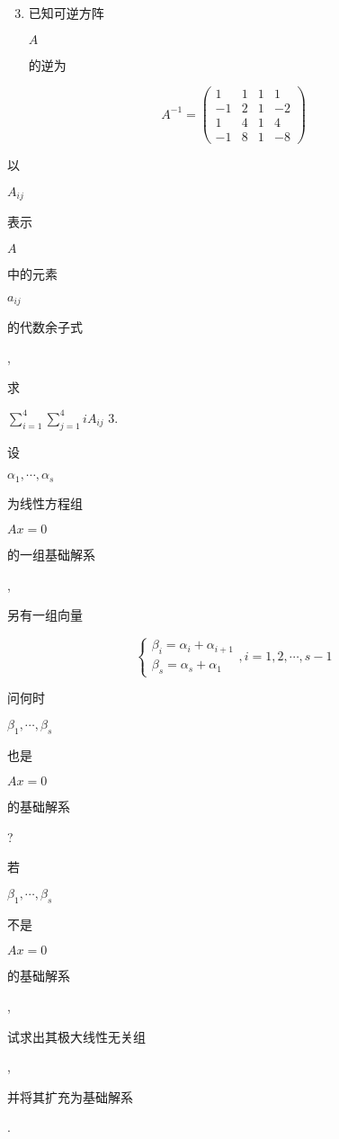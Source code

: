 \documentclass[10pt]{article}
\begin{document}
\begin{enumerate}
  \setcounter{enumi}{2}
  \item \begin{CJK}{UTF8}{mj}已知可逆方阵\end{CJK} $A$ \begin{CJK}{UTF8}{mj}的逆为\end{CJK}
\end{enumerate}
$$
A^{-1}=\left(\begin{array}{cccc}
1 & 1 & 1 & 1 \\
-1 & 2 & 1 & -2 \\
1 & 4 & 1 & 4 \\
-1 & 8 & 1 & -8
\end{array}\right)
$$
\begin{CJK}{UTF8}{mj}以\end{CJK} $A_{i j}$ \begin{CJK}{UTF8}{mj}表示\end{CJK} $A$ \begin{CJK}{UTF8}{mj}中的元素\end{CJK} $a_{i j}$ \begin{CJK}{UTF8}{mj}的代数余子式\end{CJK}, \begin{CJK}{UTF8}{mj}求\end{CJK} $\sum_{i=1}^{4} \sum_{j=1}^{4} i A_{i j}$ 3. \begin{CJK}{UTF8}{mj}设\end{CJK} $\alpha_{1}, \cdots, \alpha_{s}$ \begin{CJK}{UTF8}{mj}为线性方程组\end{CJK} $A x=0$ \begin{CJK}{UTF8}{mj}的一组基础解系\end{CJK}, \begin{CJK}{UTF8}{mj}另有一组向量\end{CJK}
$$
\left\{\begin{array}{l}
\beta_{i}=\alpha_{i}+\alpha_{i+1} \\
\beta_{s}=\alpha_{s}+\alpha_{1}
\end{array}, i=1,2, \cdots, s-1\right.
$$
\begin{CJK}{UTF8}{mj}问何时\end{CJK} $\beta_{1}, \cdots, \beta_{s}$ \begin{CJK}{UTF8}{mj}也是\end{CJK} $A x=0$ \begin{CJK}{UTF8}{mj}的基础解系\end{CJK}? \begin{CJK}{UTF8}{mj}若\end{CJK} $\beta_{1}, \cdots, \beta_{s}$ \begin{CJK}{UTF8}{mj}不是\end{CJK} $A x=0$ \begin{CJK}{UTF8}{mj}的基础解系\end{CJK}, \begin{CJK}{UTF8}{mj}试求出其极大线性无关组\end{CJK}, \begin{CJK}{UTF8}{mj}并将其扩充为基础解系\end{CJK}.
\end{document}
